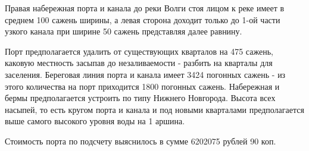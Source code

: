 \documentclass[oneside,final,14pt]{extreport}
\begin{document}
	Правая набережная порта и канала до реки Волги стоя лицом к реке имеет в среднем 100 сажень ширины, а левая сторона доходит только до 1-ой части узкого канала при ширине 50 сажень представляя далее равнину.
	
	Порт предполагается удалить от существующих кварталов на 475 сажень, каковую местность засыпав до незаливаемости - разбить на кварталы для заселения. Береговая линия порта и канала имеет 3424 погонных сажень - из этого количества на порт приходится 1800 погонных сажень. Набережная и бермы предполагается устроить по типу Нижнего Новгорода. Высота всех насыпей, то есть кругом порта и канала и под новыми кварталами предполагается выше самого высокого уровня воды на 1 аршина.
	
	Стоимость порта по подсчету выяснилось в сумме 6202075 рублей 90 коп.
	
	
	
\end{document}
